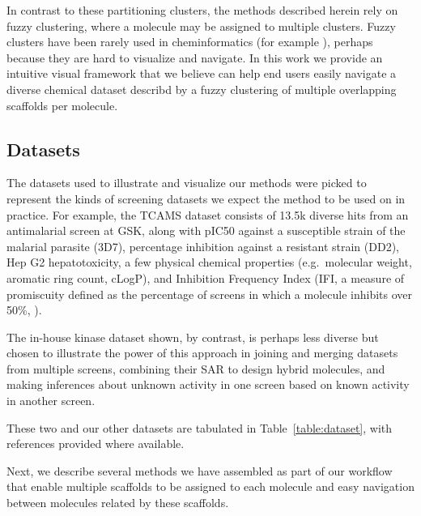 \documentclass[journal=jacsat,manuscript=article]{achemso}
\newcommand*\tref[1]{Table~\ref{table:#1}}
\newcommand*\eg{e.g.~}
\begin{document}
In contrast to these partitioning clusters, the methods described
herein rely on fuzzy clustering, where a molecule may be assigned to
multiple clusters. Fuzzy clusters have been rarely used in
cheminformatics (for example \cite{Holliday2004,Richmond2015Galois}),
perhaps because they are hard to visualize and navigate.  In this work
we provide an intuitive visual framework that we believe can help end
users easily navigate a diverse chemical dataset describd by a fuzzy
clustering of multiple overlapping scaffolds per molecule.

\subsection{Datasets}
\label{sec:datasets}
The datasets used to illustrate and visualize our methods were picked
to represent the kinds of screening datasets we expect the method to
be used on in practice. For example, the TCAMS dataset\cite{Gamo2010}
consists of 13.5k diverse hits from an antimalarial screen at GSK,
along with pIC50 against a susceptible strain of the malarial parasite
(3D7), percentage inhibition against a resistant strain (DD2), Hep G2
hepatotoxicity, a few physical chemical properties (\eg molecular
weight, aromatic ring count, cLogP), and Inhibition Frequency Index
(IFI, a measure of promiscuity defined as the percentage of screens in
which a molecule inhibits over 50\%, \cite{Chakravorty2013IFI}).

The in-house kinase dataset shown, by contrast, is perhaps less
diverse but chosen to illustrate the power of this approach in joining
and merging datasets from multiple screens, combining their SAR to
design hybrid molecules, and making inferences about unknown activity
in one screen based on known activity in another screen.

These two and our other datasets are tabulated in \tref{dataset}, with
references provided where available.

Next, we describe several methods we have assembled as part of our
workflow that enable multiple scaffolds to be assigned to each
molecule and easy navigation between molecules related by these
scaffolds.


\end{document}
